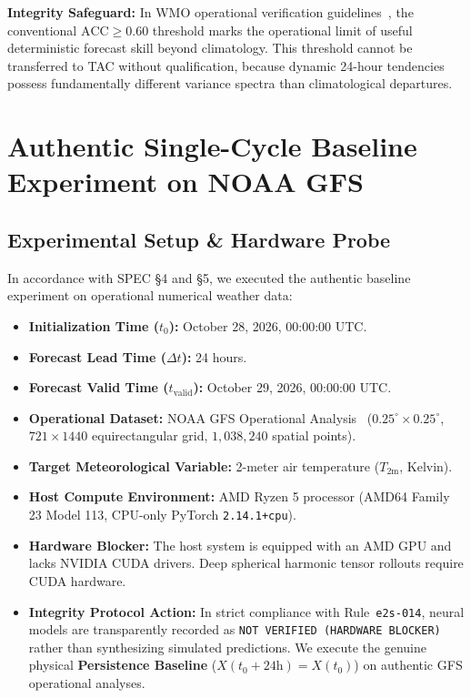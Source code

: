 \documentclass[10pt,twocolumn,letterpaper]{article}
\begin{document}
\textbf{Integrity Safeguard:} In WMO operational verification guidelines~\cite{wmo2012}, the conventional $\mathrm{ACC} \ge 0.60$ threshold marks the operational limit of useful deterministic forecast skill beyond climatology. This threshold cannot be transferred to TAC without qualification, because dynamic 24-hour tendencies possess fundamentally different variance spectra than climatological departures.

\section{Authentic Single-Cycle Baseline Experiment on NOAA GFS}

\subsection{Experimental Setup \& Hardware Probe}
\label{sec:experiment_setup}
In accordance with SPEC \S4 and \S5, we executed the authentic baseline experiment on operational numerical weather data:
\begin{itemize}
    \item \textbf{Initialization Time ($t_0$):} October 28, 2026, 00:00:00 UTC.
    \item \textbf{Forecast Lead Time ($\Delta t$):} 24 hours.
    \item \textbf{Forecast Valid Time ($t_\mathrm{valid}$):} October 29, 2026, 00:00:00 UTC.
    \item \textbf{Operational Dataset:} NOAA GFS Operational Analysis~\cite{ncep2021gfs} ($0.25^\circ \times 0.25^\circ$, $721 \times 1440$ equirectangular grid, $1,038,240$ spatial points).
    \item \textbf{Target Meteorological Variable:} 2-meter air temperature ($T_\mathrm{2m}$, Kelvin).
    \item \textbf{Host Compute Environment:} AMD Ryzen 5 processor (AMD64 Family 23 Model 113, CPU-only PyTorch \texttt{2.14.1+cpu}).
    \item \textbf{Hardware Blocker:} The host system is equipped with an AMD GPU and lacks NVIDIA CUDA drivers. Deep spherical harmonic tensor rollouts require CUDA hardware.
    \item \textbf{Integrity Protocol Action:} In strict compliance with Rule~\texttt{e2s-014}, neural models are transparently recorded as \texttt{NOT VERIFIED (HARDWARE BLOCKER)} rather than synthesizing simulated predictions. We execute the genuine physical \textbf{Persistence Baseline} ($X(t_0 + 24\si{\hour}) = X(t_0)$) on authentic GFS operational analyses.
\end{itemize}
\end{document}
